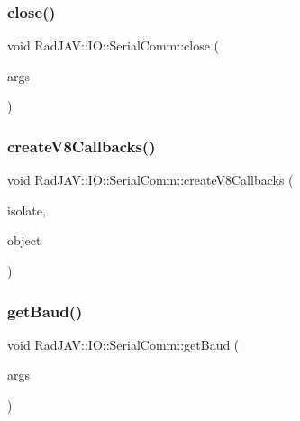 \subsubsection{\texorpdfstring{close()}{close()}}
{\footnotesize\ttfamily void Rad\+J\+A\+V\+::\+I\+O\+::\+Serial\+Comm\+::close (\begin{DoxyParamCaption}\item[{const v8\+::\+Function\+Callback\+Info$<$ v8\+::\+Value $>$ \&}]{args }\end{DoxyParamCaption})\hspace{0.3cm}{\ttfamily [static]}}

\mbox{\label{class_rad_j_a_v_1_1_i_o_1_1_serial_comm_ac9797819a35880ed029654ebb845fbfc}} 
\subsubsection{\texorpdfstring{create\+V8\+Callbacks()}{createV8Callbacks()}}
{\footnotesize\ttfamily void Rad\+J\+A\+V\+::\+I\+O\+::\+Serial\+Comm\+::create\+V8\+Callbacks (\begin{DoxyParamCaption}\item[{v8\+::\+Isolate $\ast$}]{isolate,  }\item[{v8\+::\+Local$<$ v8\+::\+Object $>$}]{object }\end{DoxyParamCaption})\hspace{0.3cm}{\ttfamily [static]}}

\mbox{\label{class_rad_j_a_v_1_1_i_o_1_1_serial_comm_aed3dc9a6197679814d6d2adec0e6a3fd}} 
\subsubsection{\texorpdfstring{get\+Baud()}{getBaud()}}
{\footnotesize\ttfamily void Rad\+J\+A\+V\+::\+I\+O\+::\+Serial\+Comm\+::get\+Baud (\begin{DoxyParamCaption}\item[{const v8\+::\+Function\+Callback\+Info$<$ v8\+::\+Value $>$ \&}]{args }\end{DoxyParamCaption})\hspace{0.3cm}{\ttfamily [static]}}

